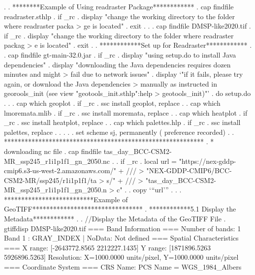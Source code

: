 . 
. ********Example of Using readraster Package************
. cap findfile readraster.sthlp
{\smallskip}
.     if _rc {\lbr}
.     display "change the working directory to the folder where readraster packa
> ge is located"
.     exit
.     {\rbr}
{\smallskip}
. 
. cap findfile DMSP-like2020.tif
{\smallskip}
. if _rc {\lbr}
.    display "change the working directory to the folder where readraster packag
> e is located"
.    exit
. {\rbr}
{\smallskip}
. ************Set up for Readraster************
. 
. cap findfile gt-main-32.0.jar
{\smallskip}
. if _rc {\lbr}
.    display "using setup.do to install Java dependencies"
.    display "downloading the Java dependencies requires dozen minutes and might
>  fail due to network issues"
.    display `"if it fails, please try again, or download the Java dependencies 
> manually as instructed in georools_init (see {\lbr}view "geotools_init.sthlp":help 
> geotools_init{\rbr})"'
.    do setup.do
. {\rbr}
{\smallskip}
. 
. cap which geoplot
{\smallskip}
. if _rc {\lbr}
.    ssc install geoplot, replace
. {\rbr}
{\smallskip}
. cap which lmoremata.mlib
{\smallskip}
. if _rc {\lbr}
.     ssc install moremata, replace
. {\rbr}
{\smallskip}
. cap which heatplot
{\smallskip}
. if _rc {\lbr}
.     ssc install heatplot, replace
. {\rbr}
{\smallskip}
. cap which palettes.hlp
{\smallskip}
. if _rc {\lbr}
.     ssc install palettes, replace
. {\rbr}
{\smallskip}
. 
. 
. 
. set scheme sj, permanently
({} preference recorded)
{\smallskip}
. 
. **********************************************************
. * downloading nc file
. cap findfile tas_day_BCC-CSM2-MR_ssp245_r1i1p1f1_gn_2050.nc
{\smallskip}
. 
. if _rc{\lbr}
.         local url = "https://nex-gddp-cmip6.s3-us-west-2.amazonaws.com/" + ///
>                                 "NEX-GDDP-CMIP6/BCC-CSM2-MR/ssp245/r1i1p1f1/ta
> s/" + ///
>                                 "tas_day_BCC-CSM2-MR_ssp245_r1i1p1f1_gn_2050.n
> c"
.                                 
.         copy `"`url'"' .
. {\rbr}
{\smallskip}
. **************************Example of GeoTIFF********************************
. ************5.1 Display the Metadata************
. 
. //Display the Metadata of the GeoTIFF File
. gtiffdisp DMSP-like2020.tif
{\smallskip}
=== Band Information ===
Number of bands: 1
Band 1 : GRAY_INDEX           | NoData: Not defined
{\smallskip}
=== Spatial Characteristics ===
X range: [-2643772.8565 {\tytilde} 2212227.1435]
Y range: [1871896.5263 {\tytilde} 5926896.5263]
Resolution: X=1000.0000 units/pixel, Y=1000.0000 units/pixel
{\smallskip}
=== Coordinate System ===
CRS Name: PCS Name = WGS_1984_Albers
